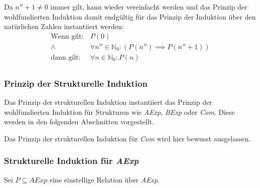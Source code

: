 																	Da $ n'' + 1 \neq 0 $ immer gilt, kann wieder vereinfacht werden und das Prinzip der wohlfundierten Induktion damit endgültig für das Prinzip der Induktion über den natürlichen Zahlen instantiiert werden:
																	\begin{align*}
																		\text{Wenn gilt:} & \,P(0)                                                          \\
																		\land             & \,\forall n'' \in \mathbb{N} _ 0 : (P(n'') \implies P(n'' + 1)) \\
																		\text{dann gilt:} & \,\forall n \in \mathbb{N} _ 0 : P(n)                           \\
																	\end{align*}

															\subsubsection{Prinzip der Strukturelle Induktion}
																Das Prinzip der strukturellen Induktion instantiiert das Prinzip der wohlfundierten Induktion für Strukturen wie \textit{AExp}, \textit{BExp} oder \textit{Com}. Diese werden in den folgenden Abschnitten vorgestellt.

																Das Prinzip der strukturellen Induktion für \textit{Com} wird hier bewusst ausgelassen.

															\subsubsection{Strukturelle Induktion für \textit{AExp}}
																Sei $ P \subseteq \textit{AExp} $ eine einstellige Relation über \textit{AExp}.

